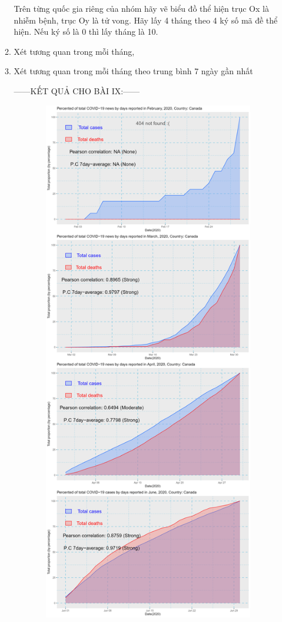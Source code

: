 \documentclass[a4paper]{article}
\theoremstyle{definition}
\begin{document}
\begin{enumerate}[i)]
\begin{enumerate}[1)]
			Trên từng quốc gia riêng của nhóm hãy vẽ biểu đồ thể hiện trục Ox là nhiễm bệnh, trục Oy là tử vong. Hãy lấy 4 tháng theo 4 ký số mã đề thể hiện. Nếu ký số là 0 thì lấy tháng là 10.
			\item Xét tương quan trong mỗi tháng, 
			\item Xét tương quan trong mỗi tháng theo trung bình 7 ngày gần nhất\\
			\begin{center}
			    ------KẾT QUẢ CHO BÀI IX:------
			\end{center}
			\begin{figure}[H]
				\centering
				\includegraphics[height=23cm,width=13cm]{images/9.1.png}

\end{figure}
\end{enumerate}
\end{enumerate}
\end{document}
